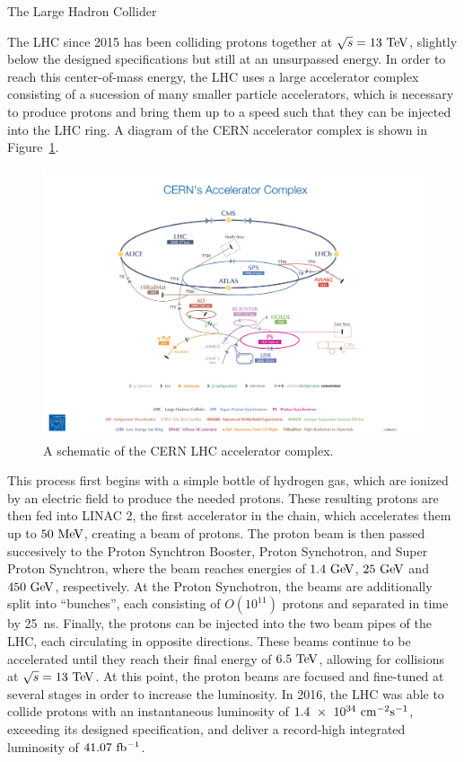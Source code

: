 \begin{section}{The Large Hadron Collider}

The LHC since 2015 has been colliding protons together at $\sqrt{s} = 13~\mathrm{Te\kern -0.1em V}$, slightly below the designed specifications but still at an unsurpassed energy.
In order to reach this center-of-mass energy, the LHC uses a large accelerator complex consisting of a sucession of many smaller particle accelerators, which is necessary to produce protons and bring them up to a speed such that they can be injected into the LHC ring.
A diagram of the CERN accelerator complex is shown in Figure~\ref{fig:lhc_accelerator_complex}.

\begin{figure}[tbp!]
\begin{center}
\includegraphics[angle=0,width=0.95\columnwidth]{fig/lhc_accelerator_complex.jpg}
\end{center}
\caption{A schematic of the CERN LHC accelerator complex.~\cite{Marcastel:1621583}}
\label{fig:lhc_accelerator_complex}
\end{figure}

This process first begins with a simple bottle of hydrogen gas, which are ionized by an electric field to produce the needed protons.
These resulting protons are then fed into LINAC 2, the first accelerator in the chain, which accelerates them up to $50~\mathrm{Me\kern -0.1em V}$, creating a beam of protons.
The proton beam is then passed succesively to the Proton Synchtron Booster, Proton Synchotron, and Super Proton Synchtron, where the beam reaches energies of $1.4~\mathrm{Ge\kern -0.1em V}$, $25~\mathrm{Ge\kern -0.1em V}$ and $450~\mathrm{Ge\kern -0.1em V}$, respectively.
At the Proton Synchotron, the beams are additionally split into ``bunches'', each consisting of $O(10^{11})$ protons and separated in time by 25~ns. 
Finally, the protons can be injected into the two beam pipes of the LHC, each circulating in opposite directions. 
These beams continue to be accelerated until they reach their final energy of $6.5~\mathrm{Te\kern -0.1em V}$, allowing for collisions at $\sqrt{s} = 13~\mathrm{Te\kern -0.1em V}$.
At this point, the proton beams are focused and fine-tuned at several stages in order to increase the luminosity. 
In 2016, the LHC was able to collide protons with an instantaneous luminosity of $1.4~\times~10^{34}~\mathrm{cm}^{-2}\mathrm{s}^{-1}$, exceeding its designed specification, and deliver a record-high integrated luminosity of $41.07~\mathrm{fb^{-1}}$.


\end{section}
